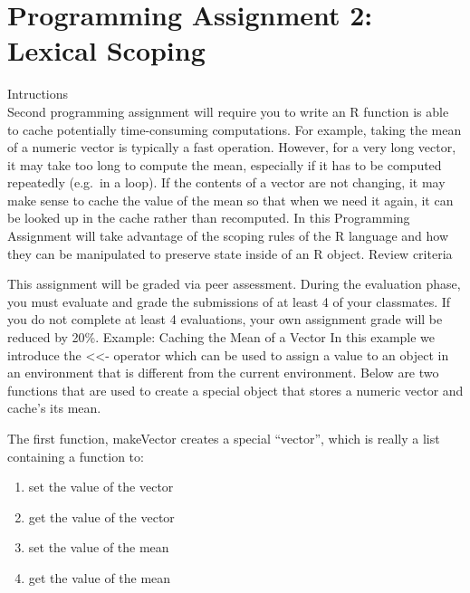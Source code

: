 \documentclass[
]{article}
\author{}
\date{\vspace{-2.5em}}
\newenvironment{Shaded}{\begin{snugshade}}{\end{snugshade}}
\newcommand{\DataTypeTok}[1]{\textcolor[rgb]{0.13,0.29,0.53}{#1}}
\newcommand{\KeywordTok}[1]{\textcolor[rgb]{0.13,0.29,0.53}{\textbf{#1}}}
\newcommand{\NormalTok}[1]{#1}
\newcommand{\OperatorTok}[1]{\textcolor[rgb]{0.81,0.36,0.00}{\textbf{#1}}}
\newcommand{\OtherTok}[1]{\textcolor[rgb]{0.56,0.35,0.01}{#1}}
\newcommand{\StringTok}[1]{\textcolor[rgb]{0.31,0.60,0.02}{#1}}
\providecommand{\tightlist}{%
  \setlength{\itemsep}{0pt}\setlength{\parskip}{0pt}}
\begin{document}
\hypertarget{programming-assignment-2-lexical-scoping}{%
\section{Programming Assignment 2: Lexical
Scoping}\label{programming-assignment-2-lexical-scoping}}

\begin{Shaded}
\end{Shaded}

Intructions\\
Second programming assignment will require you to write an R function is
able to cache potentially time-consuming computations. For example,
taking the mean of a numeric vector is typically a fast operation.
However, for a very long vector, it may take too long to compute the
mean, especially if it has to be computed repeatedly (e.g.~in a loop).
If the contents of a vector are not changing, it may make sense to cache
the value of the mean so that when we need it again, it can be looked up
in the cache rather than recomputed. In this Programming Assignment will
take advantage of the scoping rules of the R language and how they can
be manipulated to preserve state inside of an R object. Review criteria

This assignment will be graded via peer assessment. During the
evaluation phase, you must evaluate and grade the submissions of at
least 4 of your classmates. If you do not complete at least 4
evaluations, your own assignment grade will be reduced by 20\%. Example:
Caching the Mean of a Vector In this example we introduce the
\textless\textless- operator which can be used to assign a value to an
object in an environment that is different from the current environment.
Below are two functions that are used to create a special object that
stores a numeric vector and cache's its mean.

The first function, makeVector creates a special ``vector'', which is
really a list containing a function to:

\begin{enumerate}
\def\labelenumi{\arabic{enumi}.}
\tightlist
\item
  set the value of the vector
\item
  get the value of the vector
\item
  set the value of the mean
\item
  get the value of the mean
\end{enumerate}
\end{document}
